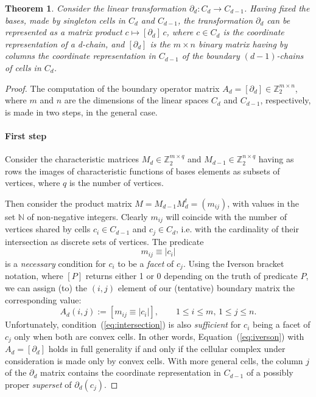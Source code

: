 \documentclass[11pt,oneside]{article}	%
\newtheorem{theorem}{Theorem}
\def\N{\mathbb{N}}
\def\Z{\mathbb{Z}}
\begin{document}
\begin{theorem}
Consider the linear transformation $\partial_d: C_d \to C_{d-1}$. Having fixed the bases, made by singleton cells in $C_d$ and $C_{d-1}$, the transformation $\partial_d$ can be represented as a matrix product ${c} \mapsto [\partial_d]\, {c}$, where ${c}\in C_d$ is the coordinate representation of a d-chain, and $[\partial_d]$ is the $m\times n$ binary matrix having \emph{by columns} the coordinate representation in $C_{d-1}$ of the boundary $(d-1)$-chains of cells in $C_{d}$.
\end{theorem}

\begin{proof}
The computation of the boundary operator matrix $A_d = [\partial_d] \in\Z_2^{m\times n}$, where $m$ and $n$ are the dimensions of the linear spaces $C_d$ and $C_{d-1}$, respectively, is made in two steps, in the general case.

\paragraph{First step} 
Consider the characteristic matrices $M_d\in\Z_2^{m\times q}$ and $M_{d-1}\in\Z_2^{n\times q}$ having as rows the images of characteristic functions of bases elements as subsets of vertices, where $q$ is the number of vertices.

Then consider the product matrix $M=M_{d-1}M_{d}^t=(m_{ij})$, with values in the set $\N$ of non-negative integers. Clearly $m_{ij}$ will coincide with the number of vertices shared by cells $c_i\in C_{d-1}$ and $c_j\in C_d$, i.e. with the cardinality of their intersection as discrete sets of vertices. The predicate 
\begin{equation}
m_{ij} \equiv |c_i|
\label{eq:intersection}
\end{equation}
is a \emph{necessary} condition for $c_i$ to be a \emph{facet} of $c_j$. Using the Iverson bracket notation, where $[P]$ returns either 1 or 0 depending on the truth of predicate $P$, we can  assign (to) the $(i,j)$ element of our (tentative) boundary matrix the corresponding value:
\begin{equation}
A_d(i,j) := [m_{ij} \equiv |c_i|], \qquad 1\leq i\leq m,\, 1\leq j\leq n.
\label{eq:iverson}
\end{equation}
Unfortunately, condition~(\ref{eq:intersection}) is also \emph{sufficient} for $c_i$ being a facet of $c_j$ only when both are convex cells. In other words, Equation~(\ref{eq:iverson}) with $A_d=[\partial_d]$ holds in full generality if and only if the cellular complex under consideration is made only by convex cells. With more general cells, the column $j$ of the $\partial_d$ matrix contains the coordinate representation in $C_{d-1}$ of a possibly proper \emph{superset}  of $\partial_d(c_j)$.


\end{proof}
\end{document}
